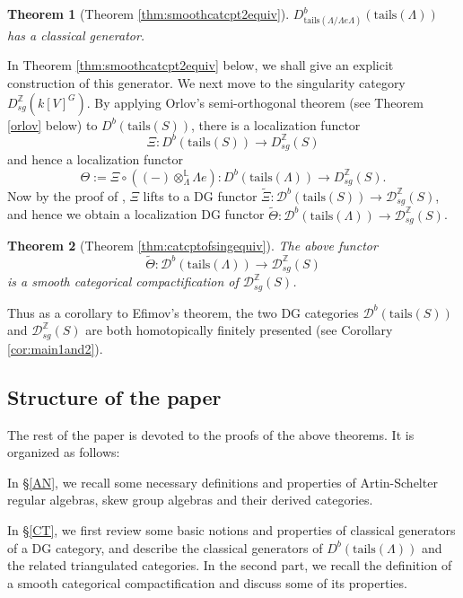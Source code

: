 \documentclass[11pt,reqno]{amsart}
\newtheorem{theorem}{Theorem}[section]
\theoremstyle{definition}
\begin{document}
\begin{theorem}[Theorem \ref{thm:smoothcatcpt2equiv}]\label{thm:smoothcatcpt2}
$D^{b}_{\mathrm{tails}(\Lambda/\Lambda e \Lambda)}(\mathrm{tails}(\Lambda))$ 
has a classical generator.
\end{theorem}

In Theorem
\ref{thm:smoothcatcpt2equiv}
below, we shall give
an explicit construction of
this generator.
We next move to the singularity category $D_{sg}^{\mathbb{Z}}(k[V]^G)$. 
By applying Orlov's semi-orthogonal theorem
(see Theorem \ref{orlov} below) to
$D^{b}(\mathrm{tails}(S))$, there is a localization functor
$$
\Xi: D^{b}(\mathrm{tails}(S)) \rightarrow D^{\mathbb{Z}}_{sg}(S)
$$
and hence a localization functor
$$
\Theta :=\Xi \circ ((-) \otimes^{\mathbb{L}}_{\Lambda} 
\Lambda e ): D^{b}(\mathrm{tails}
(\Lambda)) \rightarrow D^{\mathbb{Z}}_{sg}(S).
$$
Now by the proof of \cite[Theorem 16]{DR2}, 
$\Xi$ lifts to a DG functor
$\tilde{\Xi}: \mathcal{D}^{b}(\mathrm{tails}(S)) 
\rightarrow \mathcal{D}_{sg}^{\mathbb{Z}}(S)$,
and hence we obtain a localization DG functor
 $\tilde{\Theta} : \mathcal{D}^{b}(\mathrm{tails}
(\Lambda)) \rightarrow \mathcal{D}^{\mathbb{Z}}_{sg}(S)$. 


\begin{theorem}[Theorem \ref{thm:catcptofsingequiv}]\label{thm:catcptofsing}
The above functor
$$
\tilde{\Theta}: \mathcal{D}^{b}(\mathrm{tails}(\Lambda)) 
\rightarrow \mathcal{D}_{sg}^{\mathbb{Z}}(S)
$$
is a smooth categorical compactification of $\mathcal{D}_{sg}^{\mathbb{Z}}(S)$. 
\end{theorem}

Thus as a corollary to Efimov's theorem,
the two DG categories $\mathcal{D}^{b}(\mathrm{tails}(S))$ and 
$\mathcal{D}_{sg}^{\mathbb{Z}}(S)$ are both homotopically finitely presented (see Corollary
\ref{cor:main1and2}).

\subsection{Structure of the paper}
The rest of the paper is devoted to the proofs of the above theorems. 
It is organized as follows:

In \S\ref{AN}, we recall some necessary 
definitions and properties
of Artin-Schelter regular algebras, skew group algebras
and their derived categories.

In \S\ref{CT}, we first 
review some basic notions
and properties of classical generators of a DG category,
and describe the classical generators of 
$D^{b}(\mathrm{tails}(\Lambda))$ and the related triangulated categories. In
the second part, we recall 
the definition of a smooth categorical compactification
and discuss some of its properties.
 
\end{document}
